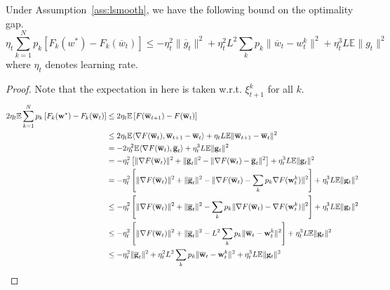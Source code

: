 \begin{lemma}
Under Assumption~\ref{ass:lsmooth}, we have the following bound on the 
optimality gap.
$$\eta_t \sum_{k=1}^{N}p_{k}\left[F_{k}(w^{\ast})-F_{k}(\overline{w}_{t})\right] \leq-\eta_{t}^{2}\|\overline{g}_{t}\|^{2}+\eta_{t}^{2}L^{2}\sum_{k}p_{k}\|\overline{w}_{t}-w_{t}^{k}\|^{2}+\eta_{t}^{3}L\mathbb{E}\|g_{t}\|^{2} $$
where $\eta_t$ denotes learning rate.
\label{lma:optgap}
\end{lemma}
\begin{proof}
Note that the expectation in here is taken w.r.t. $\xi_{t+1}^k$ for all $k$.
	\begin{align*}
	2\eta_{t}\mathbb{E}\sum_{k=1}^{N}p_{k}\left[F_{k}({\mathbf{w}}^{\ast})-F_{k}(\overline{{\mathbf{w}}}_{t})\right] & \leq 
	2\eta_{t}\mathbb{E} \left[F(\overline{{\mathbf{w}}}_{t+1})-F(\overline{{\mathbf{w}}}_{t})\right]\\
	& \leq2\eta_{t}\mathbb{E}\langle\nabla F(\overline{{\mathbf{w}}}_{t}),\overline{{\mathbf{w}}}_{t+1}-\overline{{\mathbf{w}}}_{t}\rangle+\eta_{t}L\mathbb{E}\|\overline{{\mathbf{w}}}_{t+1}-\overline{{\mathbf{w}}}_{t}\|^{2}\\
	& =-2\eta_{t}^{2}\mathbb{E}\langle\nabla F(\overline{{\mathbf{w}}}_{t}),\overline{{\mathbf{g}}}_{t}\rangle+\eta_{t}^{3}L\mathbb{E}\|{\mathbf{g}}_{t}\|^{2}\\
	& =-\eta_{t}^{2}\left[\|\nabla F(\overline{{\mathbf{w}}}_{t})\|^{2}+\|\overline{{\mathbf{g}}}_{t}\|^{2}-\|\nabla F(\overline{{\mathbf{w}}}_{t}) - \overline{{\mathbf{g}}}_{t}\|^{2}\right]+\eta_{t}^{3}L\mathbb{E}\|{\mathbf{g}}_{t}\|^{2}\\
	& =-\eta_{t}^{2}\left[\|\nabla F(\overline{{\mathbf{w}}}_{t})\|^{2}+\|\overline{{\mathbf{g}}}_{t}\|^{2}-\|\nabla F(\overline{{\mathbf{w}}}_{t})-\sum_{k}p_{k}\nabla F({\mathbf{w}}_{t}^{k})\|^{2}\right]+\eta_{t}^{3}L\mathbb{E}\|{\mathbf{g}}_{t}\|^{2}\\
	& \leq-\eta_{t}^{2}\left[\|\nabla F(\overline{{\mathbf{w}}}_{t})\|^{2}+\|\overline{{\mathbf{g}}}_{t}\|^{2}-\sum_{k}p_{k}\|\nabla F(\overline{{\mathbf{w}}}_{t})-\nabla F({\mathbf{w}}_{t}^{k})\|^{2}\right]+\eta_{t}^{3}L\mathbb{E}\|{\mathbf{g}}_{t}\|^{2}\\
	& \leq-\eta_{t}^{2}\left[\|\nabla F(\overline{{\mathbf{w}}}_{t})\|^{2}+\|\overline{{\mathbf{g}}}_{t}\|^{2}-L^{2}\sum_{k}p_{k}\|\overline{{\mathbf{w}}}_{t}-{\mathbf{w}}_{t}^{k}\|^{2}\right]+\eta_{t}^{3}L\mathbb{E}\|{\mathbf{g}}_{t}\|^{2}\\
	& \leq-\eta_{t}^{2}\|\overline{{\mathbf{g}}}_{t}\|^{2}+\eta_{t}^{2}L^{2}\sum_{k}p_{k}\|\overline{{\mathbf{w}}}_{t}-{\mathbf{w}}_{t}^{k}\|^{2}+\eta_{t}^{3}L\mathbb{E}\|{\mathbf{g}}_{t}\|^{2}
	\end{align*}
\end{proof}

